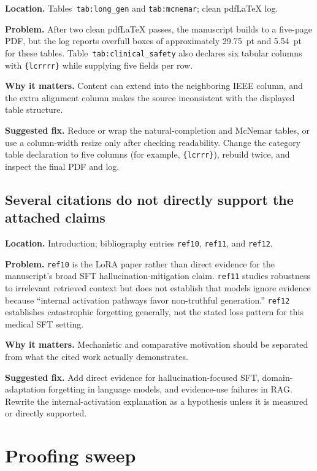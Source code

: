 \documentclass[11pt]{article}
\newcommand{\findinglabel}[1]{\textbf{#1}}
\begin{document}
\findinglabel{Location.} Tables~\texttt{tab:long\_gen} and \texttt{tab:mcnemar}; clean pdfLaTeX log.

\findinglabel{Problem.} After two clean pdfLaTeX passes, the manuscript builds to a five-page PDF, but the log reports overfull boxes of approximately 29.75~pt and 5.54~pt for these tables.  Table~\texttt{tab:clinical\_safety} also declares six tabular columns with \verb|{lcrrrr}| while supplying five fields per row.

\findinglabel{Why it matters.} Content can extend into the neighboring IEEE column, and the extra alignment column makes the source inconsistent with the displayed table structure.

\findinglabel{Suggested fix.} Reduce or wrap the natural-completion and McNemar tables, or use a column-width resize only after checking readability.  Change the category table declaration to five columns (for example, \verb|{lcrrr}|), rebuild twice, and inspect the final PDF and log.

\subsection*{Several citations do not directly support the attached claims}

\findinglabel{Location.} Introduction; bibliography entries \texttt{ref10}, \texttt{ref11}, and \texttt{ref12}.

\findinglabel{Problem.} \texttt{ref10} is the LoRA paper rather than direct evidence for the manuscript's broad SFT hallucination-mitigation claim.  \texttt{ref11} studies robustness to irrelevant retrieved context but does not establish that models ignore evidence because ``internal activation pathways favor non-truthful generation.''  \texttt{ref12} establishes catastrophic forgetting generally, not the stated loss pattern for this medical SFT setting.

\findinglabel{Why it matters.} Mechanistic and comparative motivation should be separated from what the cited work actually demonstrates.

\findinglabel{Suggested fix.} Add direct evidence for hallucination-focused SFT, domain-adaptation forgetting in language models, and evidence-use failures in RAG.  Rewrite the internal-activation explanation as a hypothesis unless it is measured or directly supported.

\section*{Proofing sweep}
\end{document}
